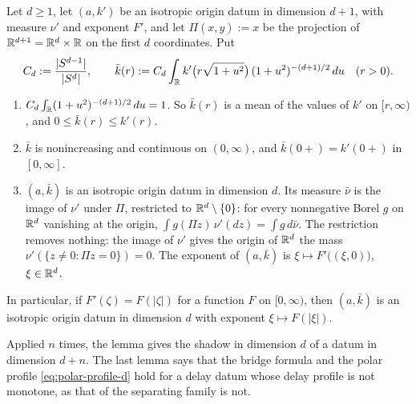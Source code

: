 \begin{lemma}\label{lem:shadow-polar-profile}
Let $d \ge 1$, let $(a, k')$ be an isotropic origin datum in dimension $d + 1$, with \Levy{}
measure $\nu'$ and exponent $F'$, and let $\Pi(x,y) := x$ be the projection of
$\mathbb{R}^{d+1} = \mathbb{R}^d \times \mathbb{R}$ on the first $d$ coordinates. Put
\[
  C_d := \frac{|S^{d-1}|}{|S^{d}|}, \qquad
  \bar k(r) := C_d\int_{\mathbb{R}} k'\bigl(r\sqrt{1+u^2}\bigr)\,(1+u^2)^{-(d+1)/2}\,du \quad (r > 0) .
\]
\begin{enumerate}
\item $C_d\int_{\mathbb{R}}(1+u^2)^{-(d+1)/2}\,du = 1$. So $\bar k(r)$ is a mean of the values of $k'$
on $[r,\infty)$, and $0 \le \bar k(r) \le k'(r)$.
\item $\bar k$ is nonincreasing and continuous on $(0,\infty)$, and $\bar k(0{+}) = k'(0{+})$ in
$[0,\infty]$.
\item $(a, \bar k)$ is an isotropic origin datum in dimension $d$. Its \Levy{} measure $\bar\nu$
is the image of $\nu'$ under $\Pi$, restricted to $\mathbb{R}^d \setminus \{0\}$: for every nonnegative
Borel $g$ on $\mathbb{R}^d$ vanishing at the origin, $\int g(\Pi z)\,\nu'(dz) = \int g\,d\bar\nu$. The
restriction removes nothing: the image of $\nu'$ gives the origin of $\mathbb{R}^d$ the mass
$\nu'(\{z \ne 0 : \Pi z = 0\}) = 0$. The exponent of $(a,\bar k)$ is
$\xi \mapsto F'\bigl((\xi,0)\bigr)$, $\xi \in \mathbb{R}^d$.
\end{enumerate}
In particular, if $F'(\zeta) = F(|\zeta|)$ for a function $F$ on $[0,\infty)$, then $(a,\bar k)$
is an isotropic origin datum in dimension $d$ with exponent $\xi \mapsto F(|\xi|)$.
\end{lemma}

Applied $n$ times, the lemma gives the shadow in dimension $d$ of a datum in dimension $d + n$.
The last lemma says that the bridge formula and the polar profile \ref{eq:polar-profile-d} hold
for a delay datum whose delay profile is not monotone, as that of the separating family is not.

